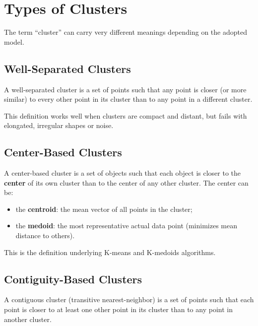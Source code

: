 \section{Types of Clusters}
\label{sec:cluster-definitions}

The term ``cluster'' can carry very different meanings depending on the adopted model.

\subsection{Well-Separated Clusters}

\begin{definition}
A well-separated cluster is a set of points such that any point is closer (or more similar) to every other point in its cluster than to any point in a different cluster.
\end{definition}

This definition works well when clusters are compact and distant, but fails with elongated, irregular shapes or noise.

\subsection{Center-Based Clusters}

\begin{definition}
A center-based cluster is a set of objects such that each object is closer to the \textbf{center} of its own cluster than to the center of any other cluster. The center can be:
\begin{itemize}
  \item the \textbf{centroid}: the mean vector of all points in the cluster;
  \item the \textbf{medoid}: the most representative actual data point (minimizes mean distance to others).
\end{itemize}
\end{definition}

This is the definition underlying K-means and K-medoids algorithms.

\subsection{Contiguity-Based Clusters}

\begin{definition}
A contiguous cluster (transitive nearest-neighbor) is a set of points such that each point is closer to at least one other point in its cluster than to any point in another cluster.
\end{definition}

